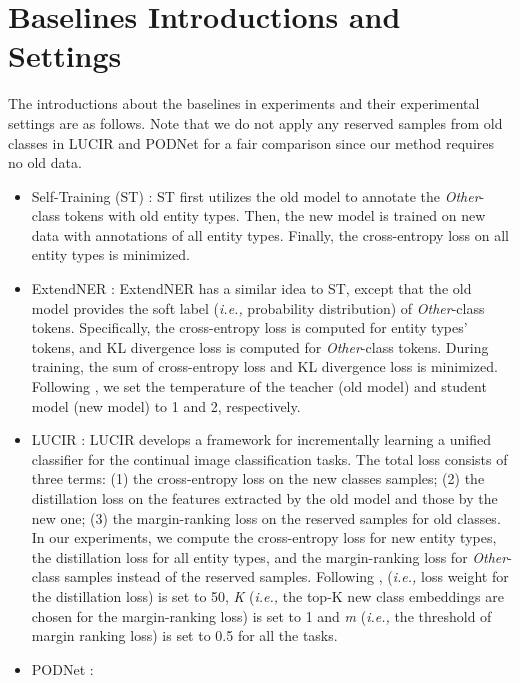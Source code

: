 \documentclass[11pt]{article}
\begin{document}
\section{Baselines Introductions and Settings\label{baselines_settings}}
The introductions about the baselines in experiments and their experimental settings are as follows. 
Note that we do not apply any reserved samples from old classes in LUCIR and PODNet for a fair comparison since our method requires no old data.
\begin{itemize}
    \item Self-Training (ST) \citep{rosenberg2005semi,de2019continual}: 
    ST first utilizes the old model to annotate the \textit{Other}-class tokens with old entity types. 
    Then, the new model is trained on new data with annotations of all entity types. 
Finally, the cross-entropy loss on all entity types is minimized.
    \item ExtendNER \citep{monaikul2021continual}: 
    ExtendNER has a similar idea to ST, except that the old model provides the soft label (\textit{i.e.,} probability distribution) of \textit{Other}-class tokens. 
    Specifically, the cross-entropy loss is computed for entity types' tokens, and KL divergence loss is computed for \textit{Other}-class tokens. 
    During training, the sum of cross-entropy loss and KL divergence loss is minimized.
    Following \citet{monaikul2021continual}, we set the temperature of the teacher (old model) and student model (new model) to 1 and 2, respectively.
    \item LUCIR \citep{hou2019learning}: 
    LUCIR develops a framework for incrementally learning a unified classifier for the continual image classification tasks. 
    The total loss consists of three terms: 
    (1) the cross-entropy loss on the new classes samples; 
    (2) the distillation loss on the features extracted by the old model and those by the new one;
    (3) the margin-ranking loss on the reserved samples for old classes. 
    In our experiments, we compute the cross-entropy loss for new entity types, the distillation loss for all entity types, and the margin-ranking loss for \textit{Other}-class samples instead of the reserved samples. 
    Following \citep{hou2019learning},  (\textit{i.e.,} loss weight for the distillation loss) is set to 50, \textit{K} (\textit{i.e.,} the top-K new class embeddings are chosen for the margin-ranking loss) is set to 1 and \textit{m} (\textit{i.e.,} the threshold of margin ranking loss) is set to 0.5 for all the tasks.
    \item PODNet \citep{douillard2020podnet}: 

\end{itemize}
\end{document}
